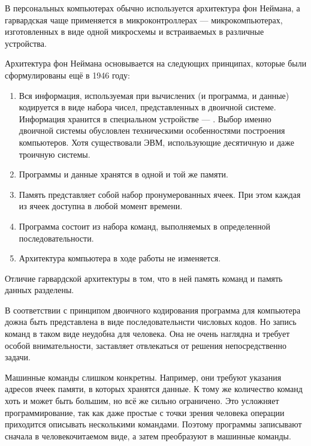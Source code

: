 В персональных компьютерах обычно используется архитектура фон
Неймана, а гарвардская чаще применяется в микроконтроллерах —
микрокомпьютерах, изготовленных в виде одной микросхемы и встраиваемых
в различные устройства.

Архитектура фон Неймана основывается на следующих принципах, которые
были сформулированы ещё в 1946 году:

\begin{enumerate}
\item {} Вся информация, используемая при вычислених (и
  программа, и данные) кодируется в виде набора чисел, представленных
  в двоичной системе. Информация хранится в специальном устройстве —
  . Выбор именно двоичной системы обусловлен
  техническими особенностями построения компьютеров. Хотя существовали
  ЭВМ, использующие десятичную и даже троичную системы.
\item {}
  Программы и данные хранятся в одной и той же памяти.
\item {}
  Память представляет собой набор пронумерованных ячеек. При этом
  каждая из ячеек доступна в любой момент времени.
\item {} Программа состоит из набора команд, выполняемых в
  определенной последовательности.
\item {} Архитектура компьютера в ходе работы не изменяется.
\end{enumerate}

Отличие гарвардской архитектуры в том, что в ней память команд и
память данных разделены.

В соответствии с принципом двоичного кодирования программа для
компьютера дожна быть представлена в виде последовательнсти числовых
кодов. Но запись команд в таком виде неудобна для человека. Она не
очень наглядна и требует особой внимательности, заставляет отвлекаться
от решения непосредственно задачи.

Машинные команды слишком конкретны. Например, они требуют указания
адресов ячеек памяти, в которых хранятся данные. К тому же количество
команд хоть и может быть большим, но всё же сильно ограничено. Это
усложняет программирование, так как даже простые с точки зрения
человека операции приходится описывать несколькими командами. Поэтому
программы записывают сначала в человекочитаемом виде, а затем
преобразуют в машинные команды.

